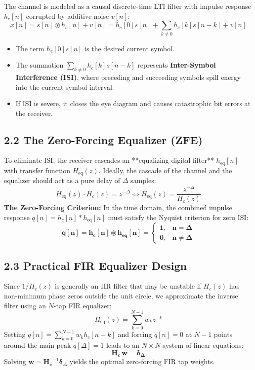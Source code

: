 \documentclass[11pt,a4paper]{article}
\begin{document}
The channel is modeled as a causal discrete-time LTI filter with impulse response $h_c[n]$ corrupted by additive noise $v[n]$:
\begin{equation}
x[n] = s[n] \circledast h_c[n] + v[n] = h_c[0]s[n] + \sum_{k \ne 0} h_c[k]s[n-k] + v[n]
\end{equation}
\begin{itemize}
    \item The term $h_c[0]s[n]$ is the desired current symbol.
    \item The summation $\sum_{k \ne 0} h_c[k]s[n-k]$ represents \textbf{Inter-Symbol Interference (ISI)}, where preceding and succeeding symbols spill energy into the current symbol interval.
    \item If ISI is severe, it closes the eye diagram and causes catastrophic bit errors at the receiver.
\end{itemize}

\subsection{2.2 The Zero-Forcing Equalizer (ZFE)}
To eliminate ISI, the receiver cascades an **equalizing digital filter** $h_{\text{eq}}[n]$ with transfer function $H_{\text{eq}}(z)$. Ideally, the cascade of the channel and the equalizer should act as a pure delay of $\Delta$ samples:
\begin{equation}
H_{\text{eq}}(z) \cdot H_c(z) = z^{-\Delta} \iff H_{\text{eq}}(z) = \frac{z^{-\Delta}}{H_c(z)}
\label{eq:ideal_eq}
\end{equation}
\textbf{The Zero-Forcing Criterion:} In the time domain, the combined impulse response $q[n] = h_c[n] * h_{\text{eq}}[n]$ must satisfy the Nyquist criterion for zero ISI:
\begin{equation}
\mathbf{q[n] = h_c[n] \circledast h_{\text{eq}}[n] = \begin{cases} 1, & n = \Delta \\ 0, & n \ne \Delta \end{cases}}
\end{equation}

\subsection{2.3 Practical FIR Equalizer Design}
Since $1/H_c(z)$ is generally an IIR filter that may be unstable if $H_c(z)$ has non-minimum phase zeros outside the unit circle, we approximate the inverse filter using an $N$-tap FIR equalizer:
\begin{equation}
H_{\text{eq}}(z) = \sum_{k=0}^{N-1} w_k z^{-k}
\end{equation}
Setting $q[n] = \sum_{k=0}^{N-1} w_k h_c[n-k]$ and forcing $q[n] = 0$ at $N-1$ points around the main peak $q[\Delta] = 1$ leads to an $N \times N$ system of linear equations:
\begin{equation}
\mathbf{H_c \, w = \delta_{\Delta}}
\end{equation}
Solving $\mathbf{w} = \mathbf{H_c}^{-1} \boldsymbol{\delta}_{\Delta}$ yields the optimal zero-forcing FIR tap weights.
\end{document}
